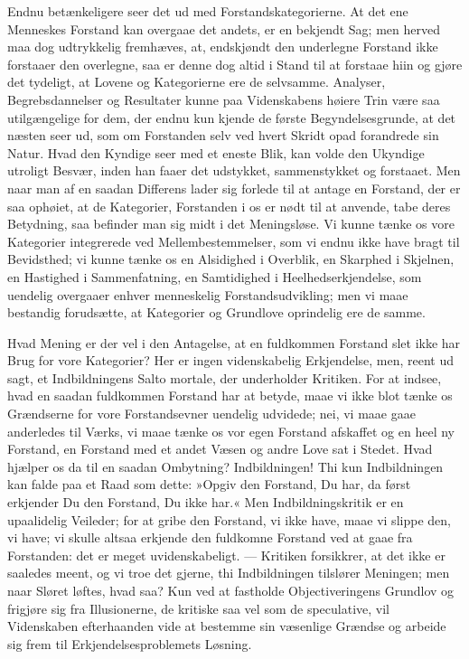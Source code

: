 \documentclass[12pt]{book}
\newcommand{\apage}[1]{\marginnote{\footnotesize\textit{[#1]}}}
\begin{document}
Endnu betænkeligere seer det ud med Forstandskategorierne. At det ene
Menneskes Forstand kan overgaae det andets, er en bekjendt Sag; men herved
maa dog udtrykkelig fremhæves, at, endskjøndt den underlegne Forstand ikke
forstaaer den overlegne, saa er denne dog altid i Stand til at forstaae
hiin og gjøre det tydeligt, at Lovene og Kategorierne ere de selvsamme.
Analyser, Begrebsdannelser og Resultater kunne paa Videnskabens høiere
Trin være saa utilgængelige for dem, der endnu kun kjende de første
Begyndelsesgrunde, at det næsten seer ud, som om Forstanden selv ved hvert
Skridt opad forandrede sin Natur. Hvad den Kyndige seer med et eneste
Blik, kan volde den Ukyndige utroligt Besvær, inden han faaer det
udstykket, sammenstykket og forstaaet. Men naar man af en saadan Differens
lader sig forlede til at antage en Forstand, der er saa ophøiet, at de
Kategorier, Forstanden i os er nødt til at anvende, tabe deres Betydning,
saa befinder man sig midt i det Meningsløse. Vi kunne tænke os vore
Kategorier integrerede ved Mellembestemmelser, som vi endnu ikke have
bragt til Bevidsthed; vi kunne tænke os en Alsidighed i Overblik, en
Skarphed i Skjelnen, en Hastighed i Sammenfatning, en Samtidighed i
Heelhedserkjendelse, som uendelig overgaaer enhver menneskelig
\apage{59} Forstandsudvikling; men vi maae bestandig forudsætte, at Kategorier og
Grundlove oprindelig ere de samme.

Hvad Mening er der vel i den Antagelse, at en fuldkommen Forstand slet ikke
har Brug for vore Kategorier? Her er ingen videnskabelig Erkjendelse, men,
reent ud sagt, et Indbildningens Salto mortale, der underholder
Kritiken. For at indsee, hvad en saadan fuldkommen Forstand har at betyde,
maae vi ikke blot tænke os Grændserne for vore Forstandsevner uendelig
udvidede; nei, vi maae gaae anderledes til Værks, vi maae tænke os vor
egen Forstand afskaffet og en heel ny Forstand, en Forstand med et andet
Væsen og andre Love sat i Stedet. Hvad hjælper os da til en saadan
Ombytning? Indbildningen! Thi kun Indbildningen kan falde paa et Raad som
dette: »Opgiv den Forstand, Du har, da først erkjender Du den Forstand, Du
ikke har.« Men Indbildningskritik er en upaalidelig Veileder; for at gribe
den Forstand, vi ikke have, maae vi slippe den, vi have; vi skulle altsaa
erkjende den fuldkomne Forstand ved at gaae fra Forstanden: det er meget
uvidenskabeligt. --- Kritiken forsikkrer, at det ikke er saaledes meent, og vi
troe det gjerne, thi Indbildningen tilslører Meningen; men naar Sløret
løftes, hvad saa? Kun ved at fastholde Objectiveringens Grundlov og
frigjøre sig fra Illusionerne, de kritiske saa vel som de speculative, vil
Videnskaben efterhaanden vide at bestemme sin væsenlige Grændse og
arbeide sig frem til Erkjendelsesproblemets Løsning.
\end{document}
